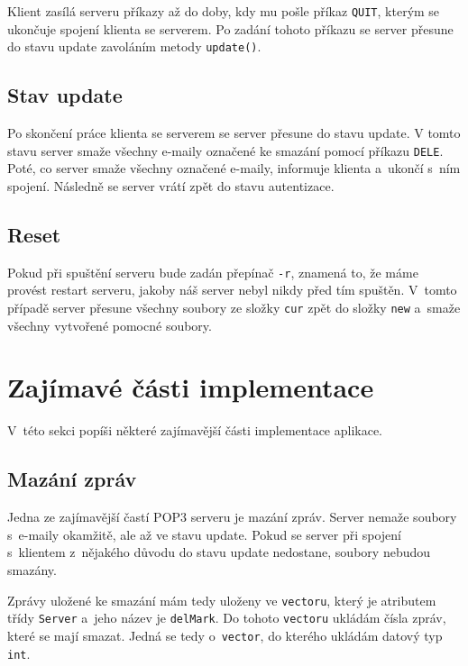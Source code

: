 \documentclass[a4paper, 11pt]{article}
\begin{document}
Klient zasílá serveru příkazy až do doby, kdy mu pošle příkaz \texttt{QUIT}, kterým se ukončuje spojení klienta se serverem. Po zadání tohoto příkazu se server přesune do stavu update zavoláním metody \texttt{update()}.

\subsection{Stav update}
Po skončení práce klienta se serverem se server přesune do stavu update. V tomto stavu server smaže všechny e-maily označené ke smazání pomocí příkazu \texttt{DELE}. Poté, co server smaže všechny označené e-maily, informuje klienta a~ukončí s~ním spojení. Následně se server vrátí zpět do stavu autentizace.

\subsection{Reset}
Pokud při spuštění serveru bude zadán přepínač \texttt{-r}, znamená to, že máme provést restart serveru, jakoby náš server nebyl nikdy před tím spuštěn. V~tomto případě server přesune všechny soubory ze složky \texttt{cur} zpět do složky \texttt{new} a~smaže všechny vytvořené pomocné soubory. 

\section{Zajímavé části implementace}
V~této sekci popíši některé zajímavější části implementace aplikace.

\subsection{Mazání zpráv}
Jedna ze zajímavější častí POP3 serveru je mazání zpráv. Server nemaže soubory s~e-maily okamžitě, ale až ve stavu update. Pokud se server při spojení s~klientem z~nějakého důvodu do stavu update nedostane, soubory nebudou smazány.

Zprávy uložené ke smazání mám tedy uloženy ve \texttt{vectoru}, který je atributem třídy \texttt{Server} a~jeho název je \texttt{delMark}. Do tohoto \texttt{vectoru} ukládám čísla zpráv, které se mají smazat. Jedná se tedy o~\texttt{vector}, do kterého ukládám datový typ \texttt{int}.
\end{document}
